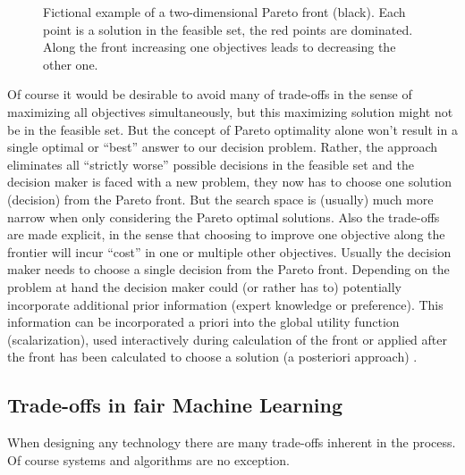 	\begin{figure}
	\begin{center}
			
	\caption{Fictional example of a two-dimensional Pareto front (black). Each point is a solution in the feasible set, the red points are dominated. Along the front increasing one objectives leads to decreasing the other one.}
	\label{fig:pareto}
	\end{center}
	\end{figure}
	
	Of course it would be desirable to avoid many of trade-offs in the sense of maximizing all objectives simultaneously, but this maximizing solution might not be in the feasible set.
	But the concept of Pareto optimality alone won't result in a single optimal or \enquote{best} answer to our decision problem.
	Rather, the approach eliminates all \enquote{strictly worse} possible decisions in the feasible set and the decision maker is faced with a new problem, they now has to choose one solution (decision) from the Pareto front.
	But the search space is (usually) much more narrow when only considering the Pareto optimal solutions.
	Also the trade-offs are made explicit, in the sense that choosing to improve one objective along the frontier will incur \enquote{cost} in one or multiple other objectives.
	Usually the decision maker needs to choose a single decision from the Pareto front.
	Depending on the problem at hand the decision maker could (or rather has to) potentially incorporate additional prior information (expert knowledge or preference).
	This information can be incorporated a priori into the global utility function (scalarization), used interactively during calculation of the front or applied after the front has been calculated to choose a solution (a posteriori approach) \cite{hwang2012multiple}.


	\subsection{Trade-offs in fair Machine Learning}
	When designing any technology \cite{alexander1964notes} there are many trade-offs inherent in the process.
	Of course  systems and algorithms are no exception.

